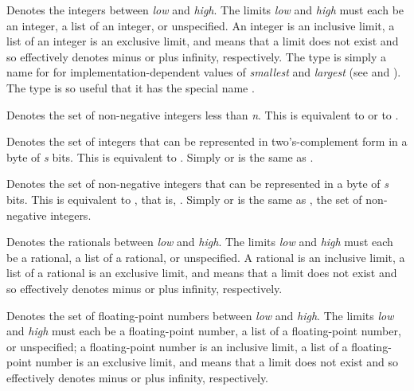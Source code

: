 \begin{flushdesc}
\item[\cd{(integer \emph{low} \emph{high})}]
Denotes the integers between
\emph{low} and \emph{high}.  The limits \emph{low} and \emph{high}
must each be an integer, a list of an integer, or unspecified.
An integer is an inclusive limit,
a list of an integer is an exclusive limit, and
\cdf{*} means that a limit does not exist
and so effectively denotes minus or plus infinity, respectively.
The type  is simply a name
for  for implementation-dependent
values of \emph{smallest} and \emph{largest}
(see  and ).
The type 
is so useful that it has the special name .

\item[\cd{(mod \emph{n})}]
Denotes the set of non-negative integers less than \emph{n}.
This is equivalent to 
or to .

\item[\cd{(signed-byte \emph{s})}]
Denotes the set of integers that can be represented
in two's-complement form in a byte of \emph{s} bits.  This is
equivalent to
.
Simply  or  is the same as .

\item[\cd{(unsigned-byte \emph{s})}]
Denotes the set of non-negative integers that can be
represented in a byte of \emph{s} bits.  This is equivalent to , that is, .
Simply  or  is the same as
, the set of non-negative integers.

\item[\cd{(rational \emph{low} \emph{high})}]
Denotes the rationals between
\emph{low} and \emph{high}.  The limits \emph{low} and \emph{high}
must each be a rational, a list of a rational, or unspecified.
A rational is an inclusive limit,
a list of a rational is an exclusive limit, and
\cdf{*} means that a limit does not exist
and so effectively denotes minus or plus infinity, respectively.

\item[\cd{(float \emph{low} \emph{high})}]
Denotes the set of floating-point numbers between
\emph{low} and \emph{high}.  The limits \emph{low} and \emph{high}
must each be a floating-point number, a list of a floating-point number,
or unspecified; a floating-point number is an inclusive limit, a list of a
floating-point number is an exclusive limit, and
\cdf{*} means that a limit does not exist
and so effectively denotes minus or plus infinity, respectively.


\end{flushdesc}
